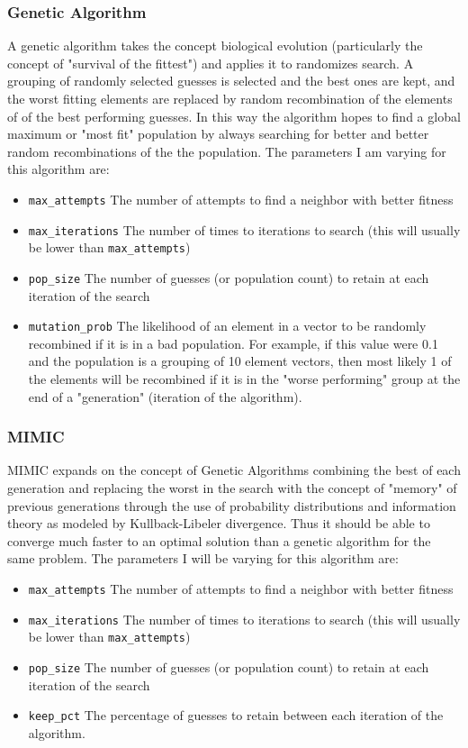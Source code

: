 \documentclass[11pt]{article}
\begin{document}
    \subsubsection*{Genetic Algorithm}
    A genetic algorithm takes the concept biological evolution (particularly the concept of "survival of the fittest") and applies it to randomizes search.
    A grouping of randomly selected guesses is selected and the best ones are kept, and the worst fitting elements are replaced by random recombination of the
    elements of of the best performing guesses.
    In this way the algorithm hopes to find a global maximum or "most fit" population by always searching for better and better random recombinations of the the population.
    The parameters I am varying for this algorithm are:
    \begin{itemize}
        \item \texttt{max\_attempts} The number of attempts to find a neighbor with better fitness
        \item \texttt{max\_iterations} The number of times to iterations to search (this will usually be lower than \texttt{max\_attempts})
        \item \texttt{pop\_size} The number of guesses (or population count) to retain at each iteration of the search
        \item \texttt{mutation\_prob} The likelihood of an element in a vector to be randomly recombined if it is in a bad population.
        For example, if this value were 0.1 and the population is a grouping of 10 element vectors, then most likely 1 of the elements will be recombined
        if it is in the "worse performing" group at the end of a "generation" (iteration of the algorithm).
    \end{itemize}
    \subsubsection*{MIMIC}
    MIMIC expands on the concept of Genetic Algorithms combining the best of each generation and replacing the worst in the
    search with the concept of "memory" of previous generations through the use of probability distributions and information theory as
    modeled by Kullback-Libeler divergence.\cite{Isbell97} Thus it should be able to converge much faster to an optimal solution
    than a genetic algorithm for the same problem.
    The parameters I will be varying for this algorithm are:
    \begin{itemize}
        \item \texttt{max\_attempts} The number of attempts to find a neighbor with better fitness
        \item \texttt{max\_iterations} The number of times to iterations to search (this will usually be lower than \texttt{max\_attempts})
        \item \texttt{pop\_size} The number of guesses (or population count) to retain at each iteration of the search
        \item \texttt{keep\_pct} The percentage of guesses to retain between each iteration of the algorithm.
    \end{itemize}
\end{document}
